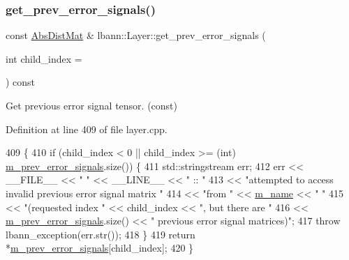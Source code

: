 \subsubsection{\texorpdfstring{get\+\_\+prev\+\_\+error\+\_\+signals()}{get\_prev\_error\_signals()}\hspace{0.1cm}{\footnotesize\ttfamily [2/2]}}
{\footnotesize\ttfamily const \hyperlink{base_8hpp_a9a697a504ae84010e7439ffec862b470}{Abs\+Dist\+Mat} \& lbann\+::\+Layer\+::get\+\_\+prev\+\_\+error\+\_\+signals (\begin{DoxyParamCaption}\item[{int}]{child\+\_\+index = {} }\end{DoxyParamCaption}) const}

Get previous error signal tensor. (const) 

Definition at line 409 of file layer.\+cpp.


\begin{DoxyCode}
409                                                                      \{
410   \textcolor{keywordflow}{if} (child\_index < 0 || child\_index >= (\textcolor{keywordtype}{int}) \hyperlink{classlbann_1_1Layer_a6fdcbf884150d0b20cffe678fefd7caa}{m\_prev\_error\_signals}.size()) \{
411     std::stringstream err;
412     err << \_\_FILE\_\_ << \textcolor{stringliteral}{" "} << \_\_LINE\_\_ << \textcolor{stringliteral}{" :: "}
413         << \textcolor{stringliteral}{"attempted to access invalid previous error signal matrix "}
414         << \textcolor{stringliteral}{"from "} << \hyperlink{classlbann_1_1Layer_aa47109ad09b399142fa92f9d3702189f}{m\_name} << \textcolor{stringliteral}{" "}
415         << \textcolor{stringliteral}{"(requested index "} << child\_index << \textcolor{stringliteral}{", but there are "}
416         << \hyperlink{classlbann_1_1Layer_a6fdcbf884150d0b20cffe678fefd7caa}{m\_prev\_error\_signals}.size() << \textcolor{stringliteral}{" previous error signal matrices)"};
417     \textcolor{keywordflow}{throw} lbann\_exception(err.str());
418   \}
419   \textcolor{keywordflow}{return} *\hyperlink{classlbann_1_1Layer_a6fdcbf884150d0b20cffe678fefd7caa}{m\_prev\_error\_signals}[child\_index];
420 \}
\end{DoxyCode}
\mbox{\label{classlbann_1_1Layer_a1acc0fa44acdeffbac158fdac3467973}} 
